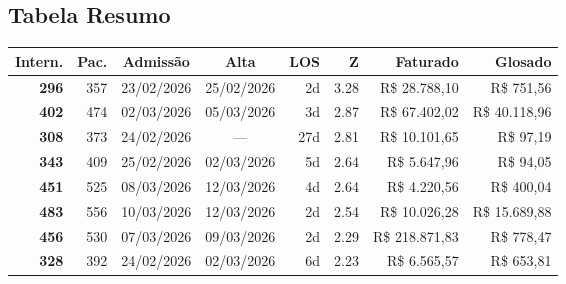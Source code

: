 \documentclass[a4paper,10pt]{article}
\begin{document}
\subsection{Tabela Resumo}
\begin{center}
\begin{longtable}{>{\scriptsize}r>{\scriptsize}r>{\scriptsize}c>{\scriptsize}c>{\scriptsize}r>{\scriptsize}r>{\scriptsize}r>{\scriptsize}r}
\toprule
\textbf{Intern.} & \textbf{Pac.} & \textbf{Admiss\~{a}o} & \textbf{Alta} & \textbf{LOS} & \textbf{Z} & \textbf{Faturado} & \textbf{Glosado} \\
\midrule
\endhead
\bottomrule
\endfoot

\textcolor{anomorange}{\textbf{296}} & 357 & 23/02/2026 & 25/02/2026 & 2d & \textcolor{anomorange}{3.28} & R\$ 28.788,10 & \textcolor{anomred}{R\$ 751,56} \\

\textcolor{anomyellow}{\textbf{402}} & 474 & 02/03/2026 & 05/03/2026 & 3d & \textcolor{anomyellow}{2.87} & R\$ 67.402,02 & \textcolor{anomred}{R\$ 40.118,96} \\

\textcolor{anomyellow}{\textbf{308}} & 373 & 24/02/2026 & — & 27d & \textcolor{anomyellow}{2.81} & R\$ 10.101,65 & \textcolor{anomred}{R\$ 97,19} \\

\textcolor{anomyellow}{\textbf{343}} & 409 & 25/02/2026 & 02/03/2026 & 5d & \textcolor{anomyellow}{2.64} & R\$ 5.647,96 & \textcolor{anomred}{R\$ 94,05} \\

\textcolor{anomyellow}{\textbf{451}} & 525 & 08/03/2026 & 12/03/2026 & 4d & \textcolor{anomyellow}{2.64} & R\$ 4.220,56 & \textcolor{anomred}{R\$ 400,04} \\

\textcolor{anomyellow}{\textbf{483}} & 556 & 10/03/2026 & 12/03/2026 & 2d & \textcolor{anomyellow}{2.54} & R\$ 10.026,28 & \textcolor{anomred}{R\$ 15.689,88} \\

\textcolor{anomyellow}{\textbf{456}} & 530 & 07/03/2026 & 09/03/2026 & 2d & \textcolor{anomyellow}{2.29} & R\$ 218.871,83 & \textcolor{anomred}{R\$ 778,47} \\

\textcolor{anomyellow}{\textbf{328}} & 392 & 24/02/2026 & 02/03/2026 & 6d & \textcolor{anomyellow}{2.23} & R\$ 6.565,57 & \textcolor{anomred}{R\$ 653,81} \\


\end{longtable}
\end{center}
\end{document}
